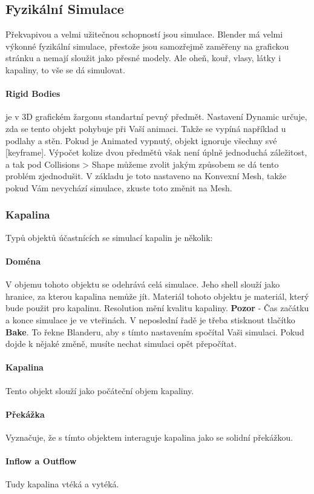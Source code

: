 \documentclass[12pt,a4paper]{report}
\begin{document}
	\subsection{Fyzikální Simulace}
	Překvapivou a velmi užitečnou schopností jsou simulace. Blender má
	velmi výkonné fyzikální simulace, přestože jsou samozřejmě zaměřeny na
	grafickou stránku a nemají sloužit jako přesné modely. Ale oheň, kouř,
	vlasy, látky i kapaliny, to vše se dá simulovat.
	\paragraph{Rigid Bodies} je v 3D grafickém žargonu standartní pevný předmět.
	Nastavení Dynamic určuje, zda se tento objekt pohybuje při Vaší animaci.
	Takže se vypíná například u podlahy a stěn. Pokud je Animated vypnutý,
	objekt ignoruje všechny své [keyframe]. Výpočet kolize dvou předmětů
	však není úplně jednoduchá záležitost, a tak pod Collisions > Shape
	můžeme zvolit jakým způsobem se dá tento problém zjednodušit.
	V základu je toto nastaveno na Konvexní Mesh, takže pokud Vám
	nevychází simulace, zkuste toto změnit na Mesh.
	
	\subsubsection{Kapalina}
	Typů objektů účastnících se simulací kapalin je několik:
	\paragraph{Doména} V objemu tohoto objektu se odehrává celá simulace. Jeho
	shell slouží jako hranice, za kterou kapalina nemůže jít. Materiál tohoto
	objektu je materiál, který bude použit pro kapalinu. Resolution mění
	kvalitu kapaliny. \textbf{Pozor} - Čas začátku a konce simulace je ve vteřinách.
	V neposlední řadě je třeba stisknout tlačítko \textbf{Bake}. To řekne Blanderu,
	aby s tímto nastavením spočítal Vaši simulaci. Pokud dojde k nějaké
	změně, musíte nechat simulaci opět přepočítat.
	\paragraph{Kapalina} Tento objekt slouží jako počáteční objem kapaliny.
	\paragraph{Překážka} Vyznačuje, že s tímto objektem interaguje kapalina jako se
	solidní překážkou.
	\paragraph{Inflow a Outflow} Tudy kapalina vtéká a vytéká.
	
\end{document}
